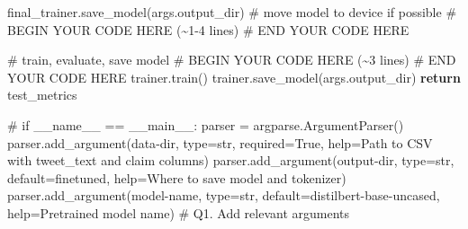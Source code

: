 \documentclass[
  letterpaper,
  DIV=11,
  numbers=noendperiod]{scrartcl}
\newenvironment{Shaded}{\begin{snugshade}}{\end{snugshade}}
\newcommand{\BuiltInTok}[1]{\textcolor[rgb]{0.00,0.23,0.31}{#1}}
\newcommand{\CommentTok}[1]{\textcolor[rgb]{0.37,0.37,0.37}{#1}}
\newcommand{\ControlFlowTok}[1]{\textcolor[rgb]{0.00,0.23,0.31}{\textbf{#1}}}
\newcommand{\NormalTok}[1]{\textcolor[rgb]{0.00,0.23,0.31}{#1}}
\newcommand{\OperatorTok}[1]{\textcolor[rgb]{0.37,0.37,0.37}{#1}}
\newcommand{\RegionMarkerTok}[1]{\textcolor[rgb]{0.00,0.23,0.31}{#1}}
\newcommand{\StringTok}[1]{\textcolor[rgb]{0.13,0.47,0.30}{#1}}
\newcommand{\VariableTok}[1]{\textcolor[rgb]{0.07,0.07,0.07}{#1}}
\begin{document}
\begin{Shaded}
\begin{Highlighting}[]
\NormalTok{    final\_trainer.save\_model(args.output\_dir)}
    \CommentTok{\# move model to device if possible}
    \CommentTok{\# }\RegionMarkerTok{BEGIN}\CommentTok{ YOUR CODE HERE (\textasciitilde{}1{-}4 lines)}
    \CommentTok{\# }\RegionMarkerTok{END}\CommentTok{ YOUR CODE HERE}

    \CommentTok{\# train, evaluate, save model}
    \CommentTok{\# }\RegionMarkerTok{BEGIN}\CommentTok{ YOUR CODE HERE (\textasciitilde{}3 lines)}
    \CommentTok{\# }\RegionMarkerTok{END}\CommentTok{ YOUR CODE HERE}
\NormalTok{    trainer.train()}
\NormalTok{    trainer.save\_model(args.output\_dir)}
    \ControlFlowTok{return}\NormalTok{ test\_metrics}




\CommentTok{\# if \_\_name\_\_ == \textquotesingle{}\_\_main\_\_\textquotesingle{}:}
\NormalTok{parser }\OperatorTok{=}\NormalTok{ argparse.ArgumentParser()}
\NormalTok{parser.add\_argument(}\StringTok{\textquotesingle{}{-}{-}data{-}dir\textquotesingle{}}\NormalTok{, }\BuiltInTok{type}\OperatorTok{=}\BuiltInTok{str}\NormalTok{, required}\OperatorTok{=}\VariableTok{True}\NormalTok{, }\BuiltInTok{help}\OperatorTok{=}\StringTok{\textquotesingle{}Path to CSV with tweet\_text and claim columns\textquotesingle{}}\NormalTok{)}
\NormalTok{parser.add\_argument(}\StringTok{\textquotesingle{}{-}{-}output{-}dir\textquotesingle{}}\NormalTok{, }\BuiltInTok{type}\OperatorTok{=}\BuiltInTok{str}\NormalTok{, default}\OperatorTok{=}\StringTok{\textquotesingle{}finetuned\textquotesingle{}}\NormalTok{, }\BuiltInTok{help}\OperatorTok{=}\StringTok{\textquotesingle{}Where to save model and tokenizer\textquotesingle{}}\NormalTok{)}
\NormalTok{parser.add\_argument(}\StringTok{\textquotesingle{}{-}{-}model{-}name\textquotesingle{}}\NormalTok{, }\BuiltInTok{type}\OperatorTok{=}\BuiltInTok{str}\NormalTok{, default}\OperatorTok{=}\StringTok{\textquotesingle{}distilbert{-}base{-}uncased\textquotesingle{}}\NormalTok{, }\BuiltInTok{help}\OperatorTok{=}\StringTok{\textquotesingle{}Pretrained model name\textquotesingle{}}\NormalTok{)}
\CommentTok{\# Q1. Add relevant arguments}



\end{Highlighting}
\end{Shaded}
\end{document}
